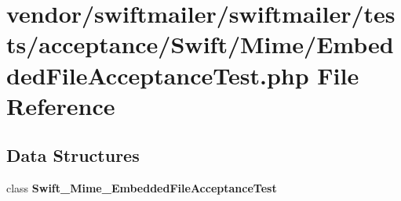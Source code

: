 \section{vendor/swiftmailer/swiftmailer/tests/acceptance/\+Swift/\+Mime/\+Embedded\+File\+Acceptance\+Test.php File Reference}
\label{_mime_2_embedded_file_acceptance_test_8php}
\subsection*{Data Structures}
\begin{DoxyCompactItemize}
\item 
class {\bf Swift\+\_\+\+Mime\+\_\+\+Embedded\+File\+Acceptance\+Test}
\end{DoxyCompactItemize}
